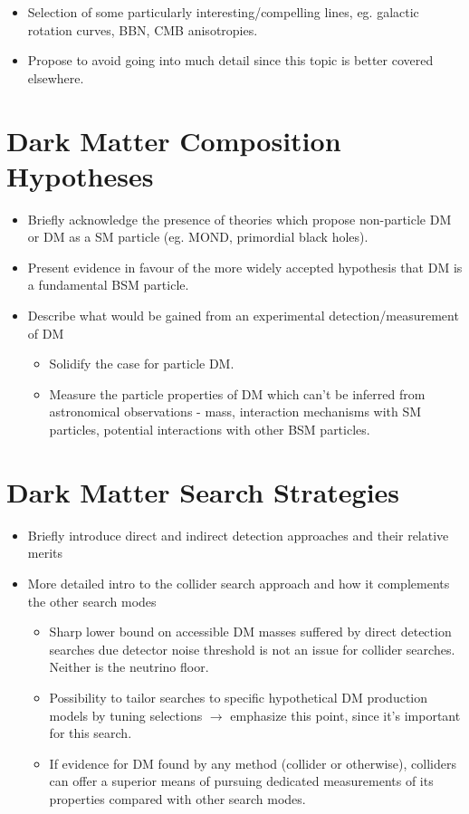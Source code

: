 \begin{itemize}
\item Selection of some particularly interesting/compelling lines, eg. galactic rotation curves, BBN, CMB anisotropies.
\item Propose to avoid going into much detail since this topic is better covered elsewhere. 
\end{itemize}

\section{Dark Matter Composition Hypotheses}

\begin{itemize}
\item Briefly acknowledge the presence of theories which propose non-particle DM or DM as a SM particle (eg. MOND, primordial black holes).
\item Present evidence in favour of the more widely accepted hypothesis that DM is a fundamental BSM particle.
\item Describe what would be gained from an experimental detection/measurement of DM
\begin{itemize}
\item Solidify the case for particle DM.
\item Measure the particle properties of DM which can't be inferred from astronomical observations - mass, interaction mechanisms with SM particles, potential interactions with other BSM particles.
\end{itemize}
\end{itemize}

\section{Dark Matter Search Strategies}
\begin{itemize}
\item Briefly introduce direct and indirect detection approaches and their relative merits
\item More detailed intro to the collider search approach and how it complements the other search modes
\begin{itemize}
\item Sharp lower bound on accessible DM masses suffered by direct detection searches due detector noise threshold is not an issue for collider searches. Neither is the neutrino floor.
\item Possibility to tailor searches to specific hypothetical DM production models by tuning selections $\rightarrow$ emphasize this point, since it's important for this search.
\item If evidence for DM found by any method (collider or otherwise), colliders can offer a superior means of pursuing dedicated measurements of its properties compared with other search modes.
\end{itemize}
\end{itemize}

